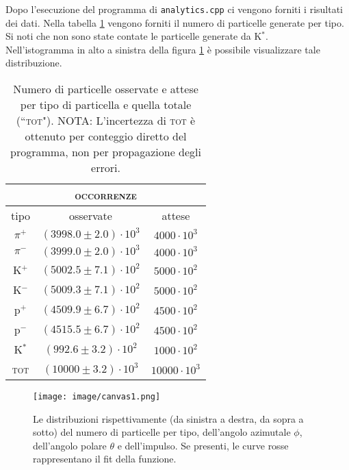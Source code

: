Dopo l'esecuzione del programma di \verb|analytics.cpp|
ci vengono forniti i risultati dei dati.
Nella tabella \ref{tab:types} vengono forniti il numero di particelle generate per tipo. Si noti che non sono state contate le particelle generate da K$^*$.\\ Nell'istogramma in alto a sinistra della figura \ref{fig:canvas1} è possibile visualizzare tale distribuzione.

\begin{table}[htp]
    \centering
    \begin{tabular}{||c|c|c||}
        \hline \hline
        \multicolumn{3}{||c||}{\textsc{occorrenze}} \\
        \hline \hline
        tipo & osservate & attese \\
        \hline
        $\pi^+$ & $ (3998.0 \pm 2.0) \cdot 10^3$ & $4000 \cdot 10^3$\\
        $\pi^-$ & $ (3999.0 \pm 2.0) \cdot 10^3$ & $4000 \cdot 10^3$\\
        K$^+$ & $ (5002.5 \pm 7.1) \cdot 10^2$ & $5000 \cdot 10^2$\\
        K$^-$ & $ (5009.3 \pm 7.1) \cdot 10^2$ & $5000 \cdot 10^2$\\
        p$^+$ & $ (4509.9 \pm 6.7) \cdot 10^2$ & $4500 \cdot 10^2$\\
        p$^-$ & $ (4515.5 \pm 6.7) \cdot 10^2$ & $4500 \cdot 10^2$\\
        K$^*$ & $ (992.6 \pm 3.2) \cdot 10^2$ & $1000 \cdot 10^2$\\
        \textsc{tot} & $ (10000 \pm 3.2) \cdot 10^3$ & $10000 \cdot 10^3$\\
        \hline \hline 
    \end{tabular}
    \caption[\small Occorrenze delle particelle]{\small Numero di particelle osservate e attese per tipo di particella e quella totale (“\textsc{tot}"). NOTA: L'incertezza di \textsc{tot} è ottenuto per conteggio diretto del programma, non per propagazione degli errori.}
    \label{tab:types}
\end{table}

\begin{figure}[htbp]
    \centering
    \texttt{[image: image/canvas1.png]}
    \caption{\small Le distribuzioni rispettivamente (da sinistra a destra, da sopra a sotto) del numero di particelle per tipo, dell'angolo azimutale $\phi$, dell'angolo polare $\theta$ e dell'impulso. Se presenti, le curve rosse rappresentano il fit della funzione.}
    \label{fig:canvas1}
\end{figure}

